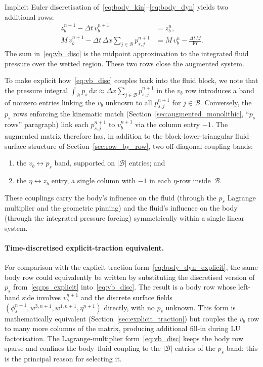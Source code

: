 \documentclass{article}
\newcommand{\Fr}{\mathrm{Fr}}
\begin{document}
Implicit Euler discretisation of~\eqref{eq:body_kin}--\eqref{eq:body_dyn} yields two additional rows:
\begin{align}
    z_b^{n+1} - \Delta t\, v_b^{n+1} &= z_b^n, \label{eq:zb_disc} \\
    M\, v_b^{n+1} - \Delta t\,\Delta x \sum_{j \in \mathcal{B}} p_{s,j}^{n+1} &= M\, v_b^n - \frac{\Delta t\, M}{\Fr}. \label{eq:vb_disc}
\end{align}
The sum in~\eqref{eq:vb_disc} is the midpoint approximation to the integrated fluid pressure over the wetted region.
These two rows close the augmented system.
\color{blue}

To make explicit how~\eqref{eq:vb_disc} couples back into the fluid block, we note that the pressure integral $\int_{\mathcal{B}} p_s\,\mathrm{d} x \approx \Delta x \sum_{j \in \mathcal{B}} p_{s,j}^{n+1}$ in the $v_b$ row introduces a band of nonzero entries linking the $v_b$ unknown to all $p_{s,j}^{n+1}$ for $j \in \mathcal{B}$.
Conversely, the $p_s$ rows enforcing the kinematic match (Section~\ref{sec:augmented_monolithic}, ``$p_s$ rows'' paragraph) link each $p_{s,j}^{n+1}$ to $v_b^{n+1}$ via the column entry $-1$.
The augmented matrix therefore has, in addition to the block-lower-triangular fluid--surface structure of Section~\ref{sec:row_by_row}, two off-diagonal coupling bands:
\begin{enumerate}
    \item the $v_b \leftrightarrow p_s$ band, supported on $|\mathcal{B}|$ entries; and
    \item the $\eta \leftrightarrow z_b$ entry, a single column with $-1$ in each $\eta$-row inside~$\mathcal{B}$.
\end{enumerate}
These couplings carry the body's influence on the fluid (through the $p_s$ Lagrange multiplier and the geometric pinning) and the fluid's influence on the body (through the integrated pressure forcing) symmetrically within a single linear system.

\paragraph{Time-discretised explicit-traction equivalent.}
For comparison with the explicit-traction form~\eqref{eq:body_dyn_explicit}, the same body row could equivalently be written by substituting the discretised version of $p_s$ from~\eqref{eq:ps_explicit} into~\eqref{eq:vb_disc}.
The result is a body row whose left-hand side involves $v_b^{n+1}$ and the discrete surface fields $(\phi_s^{n+1}, w^{3,n+1}, w^{1,n+1}, \eta^{n+1})$ directly, with no $p_s$ unknown.
This form is mathematically equivalent (Section~\ref{sec:explicit_traction}) but couples the $v_b$ row to many more columns of the matrix, producing additional fill-in during LU factorisation.
The Lagrange-multiplier form~\eqref{eq:vb_disc} keeps the body row sparse and confines the body--fluid coupling to the $|\mathcal{B}|$ entries of the $p_s$ band; this is the principal reason for selecting it.
\color{black}
\end{document}
